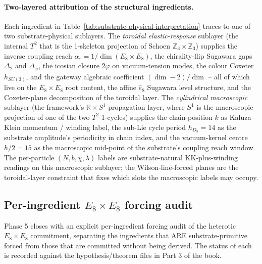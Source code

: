 ﻿\documentclass[reprint,amsmath,amssymb,aps,prd,longbibliography,floatfix]{revtex4-2}
\begin{document}
\paragraph{Two-layered attribution of the structural ingredients.}
Each ingredient in
Table~\ref{tab:substrate-physical-interpretation} traces to one of
two substrate-physical sublayers. The \emph{toroidal elastic-response}
sublayer (the internal $T^2$ that is the 1-skeleton projection of
Schoen $\mathbb{Z}_3 \times \mathbb{Z}_3$) supplies the
inverse coupling reach $\alpha_\varepsilon = 1/\dim(E_8 \times E_8)$,
the chirality-flip Sugawara gaps $\Delta_2$ and $\Delta_\varphi$, the
icosian closure $2\varphi$ on vacuum-tension modes, the colour
Coxeter $h_{SU(3)}$, and the gateway algebraic coefficient
$(\dim - 2)/\dim$ -- all of which live on the $E_8 \times E_8$
root content, the affine $\widehat{e}_8$ Sugawara level structure,
and the Coxeter-plane decomposition of the toroidal layer. The
\emph{cylindrical macroscopic} sublayer (the framework's $\mathbb{R}
\times S^1$ propagation layer, where $S^1$ is the macroscopic
projection of one of the two $T^2$ 1-cycles) supplies the
chain-position $k$ as Kaluza--Klein momentum / winding label, the
sub-Lie cycle period $h_{D_8} = 14$ as the substrate amplitude's
periodicity in chain index, and the vacuum-kernel centre
$h/2 = 15$ as the macroscopic mid-point of the substrate's coupling
reach window. The per-particle $(N, b, \chi, \lambda)$ labels are
substrate-natural KK-plus-winding readings on this macroscopic
sublayer; the Wilson-line-forced planes are the toroidal-layer
constraint that fixes which slots the macroscopic labels may
occupy.

\subsection{Per-ingredient $E_8 \times E_8$ forcing audit}
\label{sec:e8e8-audit}

Phase 5 closes with an explicit per-ingredient forcing audit of the
heterotic $E_8 \times E_8$ commitment, separating the ingredients that
ARE substrate-primitive forced from those that are committed without
being derived. The status of each is recorded against the
hypothesis/theorem files in Part 3 of the book.
\end{document}
